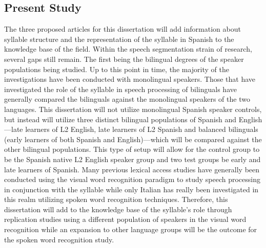 \subsection{Present Study}
The three proposed articles for this dissertation will add information about syllable structure and the representation of the syllable in Spanish to the knowledge base of the field. Within the speech segmentation strain of research, several gaps still remain. The first being the bilingual degrees of the speaker populations being studied. Up to this point in time, the majority of the investigations have been conducted with monolingual speakers. Those that have investigated the role of the syllable in speech processing of bilinguals have generally compared the bilinguals against the monolingual speakers of the two languages. This dissertation will not utilize monolingual Spanish speaker controls, but instead will utilize three distinct bilingual populations of Spanish and English—late learners of L2 English, late learners of L2 Spanish and balanced bilinguals (early learners of both Spanish and English)—which will be compared against the other bilingual populations. This type of setup will allow for the control group to be the Spanish native L2 English speaker group and two test groups be early and late learners of Spanish. Many previous lexical access studies have generally been conducted using the visual word recognition paradigm to study speech processing in conjunction with the syllable while only Italian has really been investigated in this realm utilizing spoken word recognition techniques. Therefore, this dissertation will add to the knowledge base of the syllable’s role through replication studies using a different population of speakers in the visual word recognition while an expansion to other language groups will be the outcome for the spoken word recognition study. 
